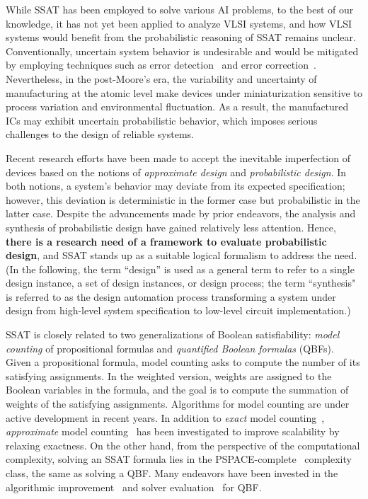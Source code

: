 While SSAT has been employed to solve various AI problems,
to the best of our knowledge,
it has not yet been applied to analyze VLSI systems,
and how VLSI systems would benefit from the probabilistic reasoning of SSAT remains unclear.
Conventionally, uncertain system behavior is undesirable and
would be mitigated by employing techniques such as
error detection~\cite{Constantinescu2003} and error correction~\cite{Mitra2006}.
Nevertheless, in the post-Moore's era,
the variability and uncertainty of manufacturing at the atomic level
make devices under miniaturization sensitive to process variation and environmental fluctuation.
As a result, the manufactured ICs may exhibit uncertain probabilistic behavior,
which imposes serious challenges to the design of reliable systems.

Recent research efforts have been made to accept the inevitable imperfection of devices
based on the notions of \textit{approximate design} and \textit{probabilistic design}.
In both notions, a system's behavior may deviate from its expected specification;
however, this deviation is deterministic in the former case but probabilistic in the latter case.
Despite the advancements made by prior endeavors,
the analysis and synthesis of probabilistic design have gained relatively less attention.
Hence,
\textbf{there is a research need of a framework to evaluate probabilistic design},
and SSAT stands up as a suitable logical formalism to address the need.
(In the following,
the term ``design'' is used as a general term to refer to a single design instance,
a set of design instances,
or design process;
the term ``synthesis" is referred to as the design automation process
transforming a system under design from high-level system specification to low-level circuit implementation.)

SSAT is closely related to two generalizations of Boolean satisfiability:
\textit{model counting} of propositional formulas and \textit{quantified Boolean formulas} (QBFs).
Given a propositional formula, model counting asks to compute the number of its satisfying assignments.
In the weighted version, weights are assigned to the Boolean variables in the formula,
and the goal is to compute the summation of weights of the satisfying assignments.
Algorithms for model counting are under active development in recent years.
In addition to \textit{exact} model counting~\cite{Sang2004,Sang2005ModelCounting},
\textit{approximate} model counting~\cite{Gomes2006,Gomes2007,Chakraborty2016}
has been investigated to improve scalability by relaxing exactness.
On the other hand, from the perspective of the computational complexity,
solving an SSAT formula lies in the PSPACE-complete~\cite{Stockmeyer1973} complexity class,
the same as solving a QBF.
Many endeavors have been invested in the algorithmic improvement~\cite{SATHandbook-QBF}
and solver evaluation~\cite{Narizzano2006} for QBF.

